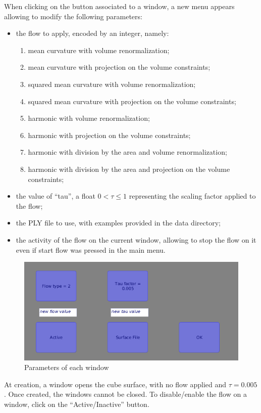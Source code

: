 \documentclass{article}
\begin{document}
When clicking on the button associated to a window, a new menu appears
allowing to modify the following parameters:
\begin{itemize}
  \item the flow to apply, encoded by an integer, namely:
  \begin{enumerate}
    \item mean curvature with volume renormalization;
    \item mean curvature with projection on the volume constraints;
    \item squared mean curvature with volume renormalization;
    \item squared mean curvature with projection on the volume constraints;
    \item harmonic with volume renormalization;
    \item harmonic with projection on the volume constraints;
    \item harmonic with division by the area and volume renormalization;
    \item harmonic with division by the area and projection on the volume constraints;
  \end{enumerate}
  \item the value of ``tau'', a float $0 < \tau \leq 1$ representing the scaling factor applied to the flow;
  \item the PLY file to use, with examples provided in the data directory;
  \item the activity of the flow on the current window,
    allowing to stop the flow on it even if start flow was pressed in the main menu.
\end{itemize}

\begin{figure}[h]
  \begin{center}
    \includegraphics[width=.5\textwidth]{img/win_params.png}
    \caption{Parameters of each window}
    \label{fig:win_params}
  \end{center}
\end{figure}

At creation, a window opens the cube surface, with no flow applied and $\tau = 0.005$.
Once created, the windows cannot be closed. To disable/enable the flow on a window,
click on the ``Active/Inactive'' button.
\end{document}
